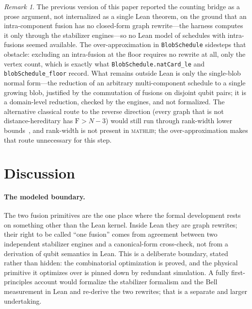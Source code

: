 \documentclass[11pt]{article}
\theoremstyle{definition}
\theoremstyle{remark}
\newtheorem{remark}[theorem]{Remark}
\newcommand{\F}{\mathrm{F}}
\newcommand{\N}{N}
\newcommand{\code}[1]{\texttt{#1}}
\begin{document}
\begin{remark}
The previous version of this paper reported the counting bridge as a prose argument, not
internalized as a single Lean theorem, on the ground that an intra-component fusion has no
closed-form graph rewrite---the harness computes it only through the stabilizer engines---so no
Lean model of schedules with intra-fusions seemed available. The over-approximation in
\code{BlobSchedule} sidesteps that obstacle: excluding an intra-fusion at the floor requires no
rewrite at all, only the vertex count, which is exactly what \code{BlobSchedule.natCard\_le} and
\code{blobSchedule\_floor} record. What remains outside Lean is only the single-blob normal
form---the reduction of an arbitrary multi-component schedule to a single growing blob, justified
by the commutation of fusions on disjoint qubit pairs; it is a domain-level reduction, checked by
the engines, and not formalized. The alternative classical route to the reverse direction (every
graph that is not distance-hereditary has $\F>\N-3$) would still run through rank-width lower
bounds~\cite{oum-rw,oum-seymour}, and rank-width is not present in \textsc{mathlib}; the
over-approximation makes that route unnecessary for this step.
\end{remark}

\section{Discussion}

\paragraph{The modeled boundary.} The two fusion primitives are the one place where the formal
development rests on something other than the Lean kernel. Inside Lean they are graph rewrites;
their right to be called ``one fusion'' comes from agreement between two independent stabilizer
engines and a canonical-form cross-check, not from a derivation of qubit semantics in Lean. This is
a deliberate boundary, stated rather than hidden: the combinatorial optimization is proved, and the
physical primitive it optimizes over is pinned down by redundant simulation. A fully
first-principles account would formalize the stabilizer formalism and the Bell measurement in Lean
and re-derive the two rewrites; that is a separate and larger undertaking.
\end{document}
